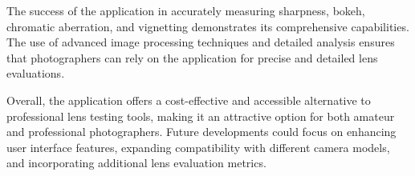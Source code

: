 The success of the application in accurately measuring sharpness, bokeh, chromatic aberration, and vignetting demonstrates its comprehensive capabilities. The use of advanced image processing techniques and detailed analysis ensures that photographers can rely on the application for precise and detailed lens evaluations.

Overall, the application offers a cost-effective and accessible alternative to professional lens testing tools, making it an attractive option for both amateur and professional photographers. Future developments could focus on enhancing user interface features, expanding compatibility with different camera models, and incorporating additional lens evaluation metrics.
